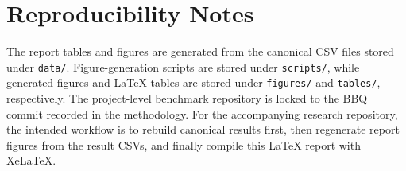 \section{Reproducibility Notes}
The report tables and figures are generated from the canonical CSV files stored under \texttt{data/}. Figure-generation scripts are stored under \texttt{scripts/}, while generated figures and LaTeX tables are stored under \texttt{figures/} and \texttt{tables/}, respectively. The project-level benchmark repository is locked to the BBQ commit recorded in the methodology. For the accompanying research repository, the intended workflow is to rebuild canonical results first, then regenerate report figures from the result CSVs, and finally compile this LaTeX report with XeLaTeX.
